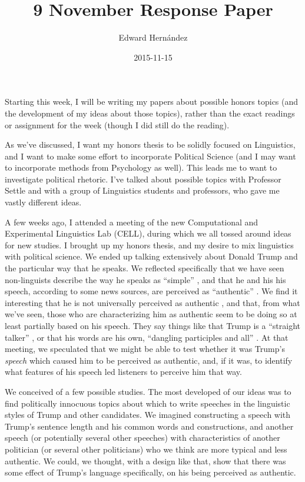 \documentclass[doc,12pt]{apa6}
\begin{document}
\title{9 November Response Paper}
\author{Edward Hern\'{a}ndez}
\date{2015-11-15}
\maketitle

\noindent
Starting this week, I will be writing my papers about possible honors topics
(and the development of my ideas about those topics), rather than the exact
readings or assignment for the week (though I did still do the reading).

\vspace{12pt}

As we've discussed, I want my honors thesis to be solidly focused on
Linguistics, and I want to make some effort to incorporate Political Science
(and I may want to incorporate methods from Psychology as well). This leads me
to want to investigate political rhetoric. I've talked about possible topics
with Professor Settle and with a group of Linguistics students and professors,
who gave me vastly different ideas.

A few weeks ago, I attended a meeting of the new Computational and Experimental
Linguistics Lab (CELL), during which we all tossed around ideas for new
studies. I brought up my honors thesis, and my desire to mix linguistics with
political science. We ended up talking extensively about Donald Trump and the
particular way that he speaks. We reflected specifically that we have seen
non-linguists describe the way he speaks as ``simple'' \cite{Katz15,Byrne15},
and that he and his his speech, according to some news sources, are perceived
as ``authentic'' \cite{Burns15,Green15}. We find it interesting that he is not
universally perceived as authentic \cite{Reingold15}, and that, from what we've
seen, those who are characterizing him as authentic seem to be doing so at
least partially based on his speech. They say things like that Trump is a
``straight talker'' \cite[para.~1]{Green15}, or that his words are his own,
``dangling participles and all'' \cite[para.~15]{Burns15}. At that meeting, we
speculated that we might be able to test whether it was Trump's \emph{speech}
which caused him to be perceived as authentic, and, if it was, to identify what
features of his speech led listeners to perceive him that way.

We conceived of a few possible studies. The most developed of our ideas was to
find politically innocuous topics about which to write speeches in the
linguistic styles of Trump and other candidates. We imagined constructing a
speech with Trump's sentence length and his common words and constructions, and
another speech (or potentially several other speeches) with characteristics of
another politician (or several other politicians) who we think are more typical
and less authentic. We could, we thought, with a design like that, show that
there was some effect of Trump's language specifically, on his being perceived
as authentic.
\end{document}
